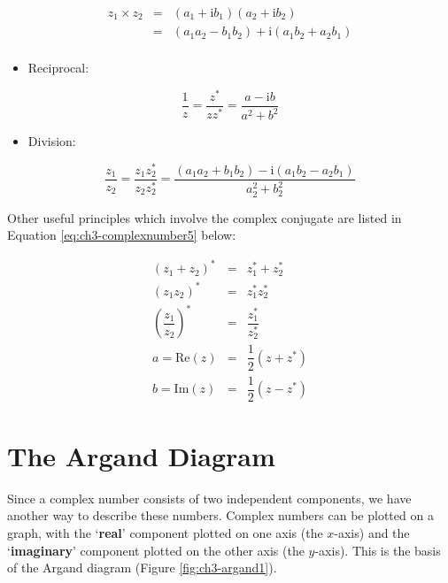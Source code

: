 \documentclass[
]{book}
\providecommand{\tightlist}{%
  \setlength{\itemsep}{0pt}\setlength{\parskip}{0pt}}
\begin{document}
\begin{equation}
\begin{array}{rcl}
z_1 \times  z_2 &=& (a_1 + \mathrm{i}b_1) (a_2 + \mathrm{i}b_2) \\
 &=& (a_1 a_2 - b_1 b_2) + \mathrm{i}(a_1 b_2 + a_2 b_1) \\
\end{array}
\end{equation}

\begin{itemize}
\tightlist
\item
  Reciprocal:
\end{itemize}

\begin{equation}
\frac{1}{z} = \frac{z^* }{z z^* } = \frac{a - \mathrm{i}b }{a^2 + b^2 }
\end{equation}

\begin{itemize}
\tightlist
\item
  Division:
\end{itemize}

\begin{equation}
\frac{z_1}{z_2} = \frac{z_1 z_2^* }{z_2 z_2^* } = \frac{(a_1 a_2 + b_1 b_2) - \mathrm{i}(a_1 b_2 - a_2 b_1)}{a_2^2 + b_2^2 }
\end{equation}

Other useful principles which involve the complex conjugate are listed in Equation \eqref{eq:ch3-complexnumber5} below:

\begin{equation}
\begin{array}{rcl}
(z_1 + z_2)^* &=& z_1^* + z_2^*\\
(z_1  z_2)^* &=& z_1^* z_2^* \\
\left( \dfrac{z_1}{z_2} \right)^* &=& \dfrac{z_1^* }{z_2^* } \\
a = \mathrm{Re}(z) &=& \dfrac{1}{2}(z + z^* ) \\
b = \mathrm{Im}(z) &=& \dfrac{1}{2}(z - z^* ) 
\end{array}
\label{eq:ch3-complexnumber5}
\end{equation}

\hypertarget{sec-ch3-arganddiagram}{%
\section{The Argand Diagram}\label{sec-ch3-arganddiagram}}

Since a complex number consists of two independent components, we have another way to describe these numbers. Complex numbers can be plotted on a graph, with the `\textbf{real}' component plotted on one axis (the \(x\)-axis) and the `\textbf{imaginary}' component plotted on the other axis (the \(y\)-axis). This is the basis of the Argand diagram (Figure \ref{fig:ch3-argand1}).
\end{document}
